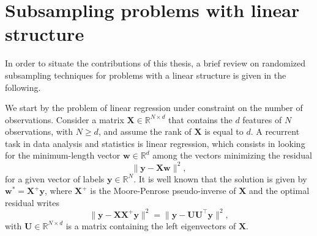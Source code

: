 \documentclass[twoside,11pt]{book}
\numberwithin{theorem}{chapter}
\numberwithin{definition}{chapter}
\numberwithin{proposition}{chapter}
\numberwithin{corollary}{chapter}
\numberwithin{example}{chapter}
\numberwithin{lemma}{chapter}
\numberwithin{assumption}{chapter}
\numberwithin{equation}{chapter}
\numberwithin{figure}{chapter}
\DeclareMathOperator{\Tran}{\intercal}
\begin{document}
 





\section{Subsampling problems with linear structure}

In order to situate the contributions of this thesis, a brief review on randomized subsampling techniques for problems with a linear structure is given in the following. 

We start by the problem of linear regression under constraint on the number of observations. Consider a matrix $\bm{X}\in \mathbb{R}^{N \times d}$ that contains the $d$ features of $N$ observations, with $N \geq d$, and assume the rank of $\bm{X}$ is equal to $d$. A recurrent task in data analysis and statistics is linear regression, which consists in looking for the minimum-length vector $\bm{w} \in \mathbb{R}^{d}$ among the vectors minimizing the residual
\begin{equation}
\|\bm{y} - \bm{X}\bm{w}\|^{2},
\end{equation}
for a given vector of labels $\bm{y} \in \mathbb{R}^{N}$. It is well known that the solution is given by $\bm{w}^{*} = \bm{X}^{+}\bm{y}$, where $\bm{X}^{+}$ is the Moore-Penrose pseudo-inverse of $\bm{X}$
and the optimal  residual writes
\begin{equation}
\|\bm{y} - \bm{X}\bm{X}^{+}\bm{y}\|^{2} = \|\bm{y} - \bm{U}\bm{U}^{\Tran}\bm{y}\|^{2},
\end{equation}
with $\bm{U} \in \mathbb{R}^{N \times d}$ is a matrix containing the left eigenvectors of $\bm{X}$.
\end{document}
